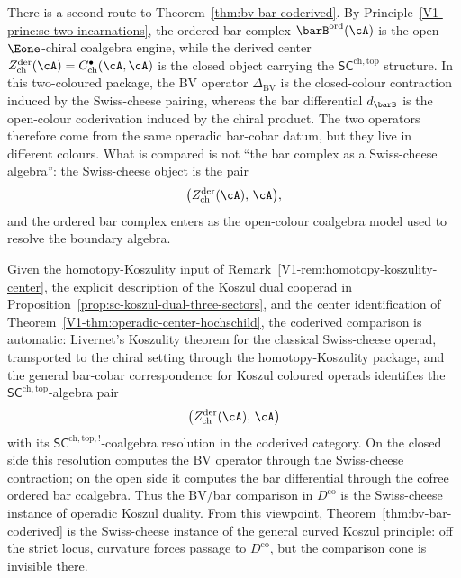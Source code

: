 \begin{remark}
\label{rem:bv-bar-coderived-operadic}%
%
%
There is a second route to
Theorem~\ref{thm:bv-bar-coderived}. By
Principle~\ref{V1-princ:sc-two-incarnations}, the ordered bar complex
$\barB^{\mathrm{ord}}(\cA)$ is the open
$\Eone$-chiral coalgebra engine, while the derived center
$Z^{\mathrm{der}}_{\mathrm{ch}}(\cA)
= C^{\bullet}_{\mathrm{ch}}(\cA,\cA)$ is the closed object carrying
the $\mathsf{SC}^{\mathrm{ch,top}}$ structure. In this two-coloured
package, the BV operator $\Delta_{\mathrm{BV}}$ is the closed-colour
contraction induced by the Swiss-cheese pairing, whereas the bar
differential $d_{\barB}$ is the open-colour coderivation induced by
the chiral product. The two operators therefore come from the same
operadic bar-cobar datum, but they live in different colours. What is
compared is not ``the bar complex as a Swiss-cheese algebra'': the
Swiss-cheese object is the pair
\[
\bigl(Z^{\mathrm{der}}_{\mathrm{ch}}(\cA),\,\cA\bigr),
\]
and the ordered bar complex enters as the open-colour coalgebra model
used to resolve the boundary algebra.

Given the homotopy-Koszulity input of
Remark~\ref{V1-rem:homotopy-koszulity-center}, the explicit
description of the Koszul dual cooperad in
Proposition~\ref{prop:sc-koszul-dual-three-sectors}, and the center
identification of Theorem~\ref{V1-thm:operadic-center-hochschild}, the
coderived comparison is automatic: Livernet's Koszulity theorem
for the classical Swiss-cheese operad, transported to the chiral
setting through the homotopy-Koszulity package, and the general bar-cobar
correspondence for Koszul coloured operads identifies the
$\mathsf{SC}^{\mathrm{ch,top}}$-algebra pair
\[
\bigl(Z^{\mathrm{der}}_{\mathrm{ch}}(\cA),\,\cA\bigr)
\]
with its
$\mathsf{SC}^{\mathrm{ch,top},!}$-coalgebra resolution in the coderived
category. On the closed side this resolution computes the BV operator
through the Swiss-cheese contraction; on the open side it computes the
bar differential through the cofree ordered bar coalgebra. Thus the
BV/bar comparison in $D^{\mathrm{co}}$ is the Swiss-cheese instance of
operadic Koszul duality. From this viewpoint,
Theorem~\ref{thm:bv-bar-coderived} is the Swiss-cheese instance of the
general curved Koszul principle: off the strict locus, curvature
forces passage to $D^{\mathrm{co}}$, but the comparison cone is
invisible there.


\end{remark}
